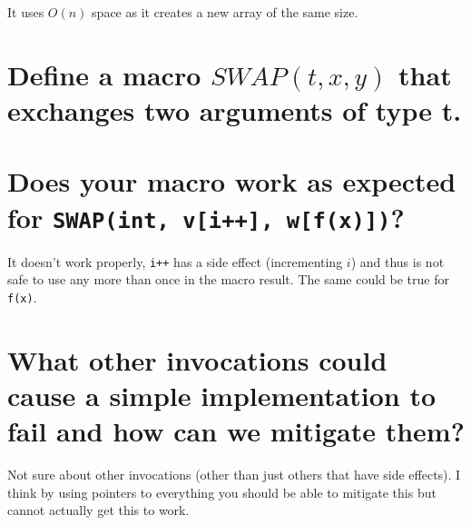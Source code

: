 \documentclass{supervision}
\begin{document}
\begin{questions}
    \begin{solution}
        
    \end{solution}
        \begin{solution}
            
            It uses $O(n)$ space as it creates a new array of the same size.
        \end{solution}
    \question{}
    \begin{parts}
        \part{Define a macro $SWAP(t,x,y)$ that exchanges two arguments of type t.}

        \begin{solution}
            
        \end{solution}
        \part{Does your macro work as expected for \lstinline|SWAP(int, v[i++], w[f(x)])|?}
        \begin{solution}
            It doesn't work properly, \lstinline|i++| has a side effect (incrementing $i$) and thus is not safe to use any more than once in the macro result. The same could be true for \lstinline|f(x)|.
        \end{solution}

        \part{What other invocations could cause a simple implementation to fail and how can we mitigate them?}
        \begin{solution}
        Not sure about other invocations (other than just others that have side effects). I think by using pointers to everything you should be able to mitigate this but cannot actually get this to work.
        \end{solution}

    \end{parts}
    \begin{solution}
        
    \end{solution}


\end{questions}
\end{document}
